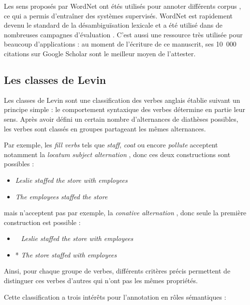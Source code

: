 Les sens proposés par WordNet ont étés utilisés pour annoter différents corpus
\citep{petrolito2014survey}, ce qui a permis d'entraîner des systèmes
supervisés. WordNet est rapidement devenu le standard de la désambiguïsation
lexicale et a été utilisé dans de nombreuses campagnes d'évaluation
\citep{navigli2009word}. C'est aussi une ressource très utilisée pour beaucoup
d'applications : au moment de l'écriture de ce manuscrit, ses 10~000 citations
sur Google Scholar sont le meilleur moyen de l'attester.

\subsection{Les classes de Levin}
\label{presentation_levin}

Les classes de Levin \citep{levin1993english} sont une classification des
verbes anglais établie suivant un principe simple : le comportement syntaxique
des verbes détermine en partie leur sens. Après avoir défini un certain nombre
d'alternances de diathèses possibles, les verbes sont classés en groupes
partageant les mêmes alternances.

Par exemple, les \textit{fill verbs} tels que \textit{staff}, \textit{coat} ou encore
\textit{pollute} \citep[p.~119]{levin1993english} acceptent notamment la
\textit{locatum subject alternation} \citep[p.~85]{levin1993english}, donc ces
deux constructions sont possibles :

\begin{itemize}
    \item \textit{Leslie staffed the store with employees}
    \item \textit{The employees staffed the store}
\end{itemize}

mais n'acceptent pas par exemple, la \textit{conative alternation}
\citep[p.~41]{levin1993english}, donc seule la première construction est
possible :

\begin{itemize}
    \item ~ \textit{Leslie staffed the store with employees}
    \item * \textit{The store staffed with employees}
\end{itemize}

Ainsi, pour chaque groupe de verbes, différents critères précis permettent de
distinguer ces verbes d'autres qui n'ont pas les mêmes propriétés.

Cette classification a trois intérêts pour l'annotation en rôles sémantiques :

